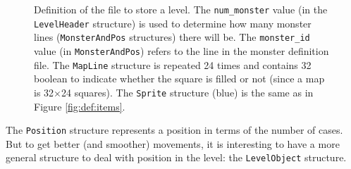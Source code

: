 \documentclass[12pt,a4paper]{article}
\newcommand{\cc}[1]{\texttt{#1}}
\begin{document}
\begin{figure}
\caption{Definition of the file to store a level. The \texttt{num\_monster} value (in the \texttt{LevelHeader} structure) is used to determine how many monster lines (\texttt{MonsterAndPos} structures) there will be. The \texttt{monster\_id} value (in \texttt{MonsterAndPos}) refers to the line in the monster definition file. The \texttt{MapLine} structure is repeated 24 times and contains 32 boolean to indicate whether the square is filled or not (since a map is 32$\times$24 squares). The \texttt{Sprite} structure (blue) is the same as in Figure \ref{fig:def:items}.}
\label{fig:def:level}
\end{figure} 

The \cc{Position} structure represents a position in terms of the number of cases. But to get better (and smoother) movements, it is interesting to have a more general structure to deal with position in the level: the \cc{LevelObject} structure.
\end{document}
